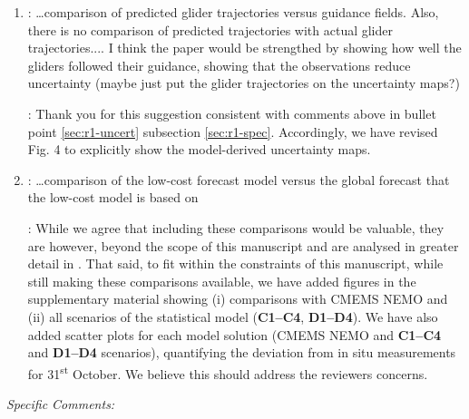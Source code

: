 \documentclass[a4paper]{article}
\begin{document}
\begin{answers}
\begin{enumerate}
    These deviations are comparable to the spatial resolution of the
    statistical model used for guidance, indicating that
    current-driven drift did not impact the interpretation of the
    results. We nevertheless provide the figure in the newly added
    supplementary material for readers who wish to examine this aspect
    in greater detail.

  \item

    \reply: \ldots comparison of predicted glider trajectories versus
    guidance fields. Also, there is no comparison of predicted
    trajectories with actual glider trajectories.... I think the paper
    would be strengthed by showing how well the gliders followed their
    guidance, showing that the observations reduce uncertainty (maybe
    just put the glider trajectories on the uncertainty maps?)

    \action: Thank you for this suggestion consistent with comments
    above in bullet point \ref{sec:r1-uncert} subsection
    \ref{sec:r1-spec}. Accordingly, we have revised Fig. 4 to
    explicitly show the model-derived uncertainty maps.

  \item\label{sec:r2-low-cost}

    \reply: \ldots comparison of the low-cost forecast model versus
    the global forecast that the low-cost model is based on

    \action: While we agree that including these comparisons would be
    valuable, they are however, beyond the scope of this manuscript
    and are analysed in greater detail in \cite{duarte2025}. That
    said, to fit within the constraints of this manuscript, while
    still making these comparisons available, we have added figures in
    the supplementary material showing (i) comparisons with CMEMS NEMO
    and (ii) all scenarios of the statistical model (\textbf{C1--C4},
    \textbf{D1--D4}). We have also added scatter plots for each model
    solution (CMEMS NEMO and \textbf{C1--C4} and \textbf{D1--D4}
    scenarios), quantifying the deviation from in situ measurements
    for 31\textsuperscript{st} October. We believe this should address
    the reviewers concerns.
    

  \end{enumerate}


\item {\it Specific Comments:}\label{sec:r2-spec}

  
  \begin{enumerate}



\end{enumerate}
\end{answers}
\end{document}

